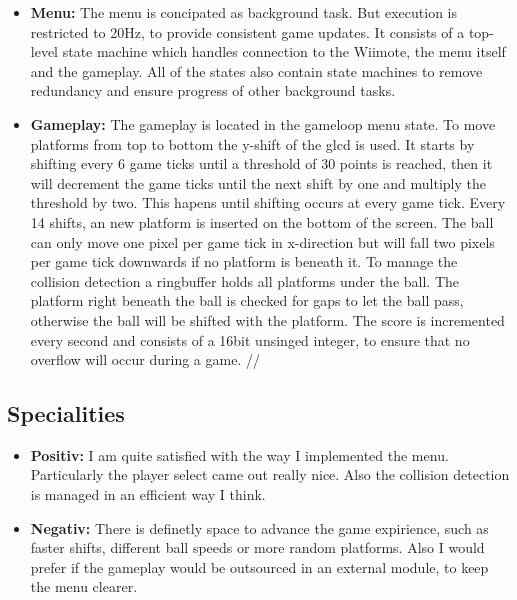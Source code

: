 \documentclass[12pt,a4paper,titlepage,oneside]{article}
\begin{document}
\begin{itemize}
    \item \textbf{Menu:} The menu is concipated as background task. But execution is restricted to 20Hz, to
        provide consistent game updates. It consists of a top-level state machine which handles connection to
        the Wiimote, the menu itself and the gameplay. All of the states also contain state machines to remove 
        redundancy and ensure progress of other background tasks. \\

    \item \textbf{Gameplay:} The gameplay is located in the gameloop menu state. To move platforms from top to
        bottom the y-shift of the glcd is used. It starts by shifting every 6 game ticks until a threshold of 30
        points is reached, then it will decrement the game ticks until the next shift by one and multiply the threshold
        by two. This hapens until shifting occurs at every game tick. Every 14 shifts, an new platform is inserted on the bottom of the
        screen. The ball can only move one pixel per game tick in x-direction but will fall two pixels per game
        tick downwards if no platform is beneath it. To manage the collision detection a ringbuffer holds all platforms
        under the ball. The platform right beneath the ball is checked for gaps to let the ball pass, otherwise the ball
        will be shifted with the platform. The score is incremented every second and consists of a 16bit unsinged integer,
        to ensure that no overflow will occur during a game. //

\end{itemize}

\subsection{Specialities}

\begin{itemize}

    \item \textbf{Positiv:} I am quite satisfied with the way I implemented the menu. Particularly the player select
        came out really nice. Also the collision detection is managed in an efficient way I think. 

    \item \textbf{Negativ:} There is definetly space to advance the game expirience, such as faster shifts, different 
        ball speeds or more random platforms. Also I would prefer if the gameplay would be outsourced in an external 
        module, to keep the menu clearer. \\

\end{itemize}
\end{document}
